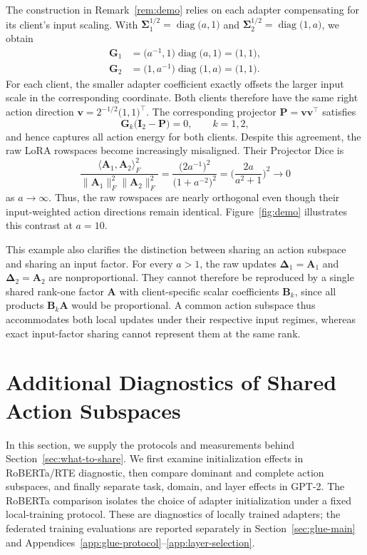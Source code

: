 \documentclass[11pt,letterpaper]{article}
\newcommand{\diag}{\operatorname{diag}}
\newcommand{\I}{\mathbf{I}}
\newcommand{\bA}{\mathbf{A}}
\newcommand{\bB}{\mathbf{B}}
\newcommand{\bG}{\mathbf{G}}
\newcommand{\bP}{\mathbf{P}}
\newcommand{\bDelta}{\boldsymbol{\Delta}}
\newcommand{\bSigma}{\boldsymbol{\Sigma}}
\newcommand{\bv}{\mathbf{v}}
\begin{document}
The construction in Remark~\ref{rem:demo} relies on each adapter compensating for its client's input scaling.
With $\bSigma_1^{1/2}=\diag\bigl(a,1\bigr)$ and $\bSigma_2^{1/2}=\diag\bigl(1,a\bigr)$, we obtain
\[
    \begin{aligned}
    	\bG_1
    	&=\bigl(a^{-1},1\bigr)\diag\bigl(a,1\bigr)
    	=\bigl(1,1\bigr),\\
    	\bG_2
    	&=\bigl(1,a^{-1}\bigr)\diag\bigl(1,a\bigr)
    	=\bigl(1,1\bigr).
    \end{aligned}
\]
For each client, the smaller adapter coefficient exactly offsets the larger input scale in the corresponding coordinate. 
Both clients therefore have the same right action direction
$\bv=2^{-1/2}\bigl(1,1\bigr)^\top$. 
The corresponding projector $\bP=\bv\bv^\top$ satisfies
\[
	\bG_k\bigl(\I_2-\bP\bigr)=0,\qquad k=1,2,
\]
and hence captures all action energy for both clients. Despite this agreement, the raw LoRA rowspaces become increasingly misaligned.  Their Projector Dice is
\[
	\frac{\langle\bA_1,\bA_2\rangle_F^2}
	{\|\bA_1\|_F^2\|\bA_2\|_F^2}
	=
	\frac{\bigl(2a^{-1}\bigr)^2}
	{\bigl(1+a^{-2}\bigr)^2}
	=
	\biggl(\frac{2a}{a^2+1}\biggr)^2
	\to 0
\]
as $a\to\infty$.
Thus, the raw rowspaces are nearly orthogonal even though their input-weighted action directions remain identical. Figure~\ref{fig:demo} illustrates this contrast at $a=10$.

This example also clarifies the distinction between sharing an action subspace and sharing an input factor. 
For every $a>1$, the raw updates $\bDelta_1=\bA_1$ and $\bDelta_2=\bA_2$ are nonproportional. 
They cannot therefore be reproduced by a single shared rank-one factor $\bA$ with client-specific scalar coefficients $\bB_k$, since all products $\bB_k\bA$ would be proportional. A common action subspace thus accommodates both local updates under their respective input regimes, whereas exact input-factor sharing cannot represent them at the same rank.

\section{Additional Diagnostics of Shared Action Subspaces}
\label{app:real-diagnostics}

In this section, we supply the protocols and measurements behind
Section~\ref{sec:what-to-share}. We first examine initialization effects
in RoBERTa/RTE diagnostic, then compare
dominant and complete action subspaces, and finally separate task, domain,
and layer effects in GPT-2. The RoBERTa comparison isolates the choice of
adapter initialization under a fixed local-training protocol. These are
diagnostics of locally trained adapters; the federated
training evaluations are reported separately in Section~\ref{sec:glue-main}
and Appendices~\ref{app:glue-protocol}--\ref{app:layer-selection}.
\end{document}
